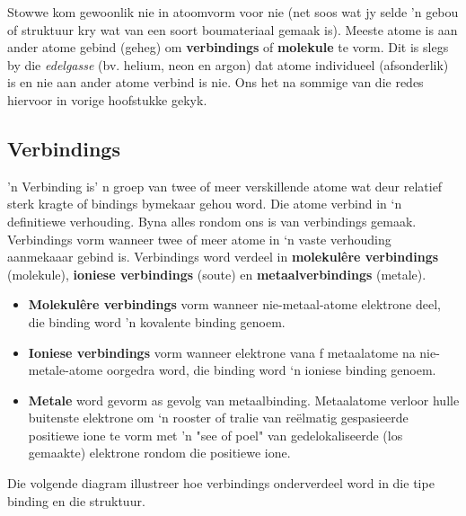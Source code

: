       \label{m38120*id307459}
Stowwe kom gewoonlik nie in atoomvorm voor nie (net soos wat jy selde 'n gebou of struktuur kry wat van een soort boumateriaal gemaak is). Meeste atome is aan ander atome  gebind (geheg) om \textbf{verbindings} of \textbf{molekule} te vorm. Dit is slegs by die \textsl{edelgasse} (bv. helium, neon en argon) dat atome individueel (afsonderlik) is en nie aan ander atome verbind is nie.  Ons het na sommige van die redes hiervoor in vorige hoofstukke gekyk.\par \pagebreak
    \subsection*{Verbindings}
            \nopagebreak

 {'n Verbinding is' n groep van twee of meer verskillende atome wat deur relatief sterk kragte of bindings bymekaar gehou word. Die atome verbind in ‘n definitiewe verhouding.} 
Byna alles rondom ons is van verbindings gemaak. Verbindings vorm wanneer twee of meer atome in ‘n vaste verhouding aanmekaaar gebind is. Verbindings word verdeel in \textbf{molekul\^{e}re verbindings} (molekule), \textbf{ioniese verbindings} (soute) en \textbf{metaalverbindings} (metale).
\begin{itemize}[noitemsep]
 \item \textbf{Molekul\^{e}re verbindings} vorm wanneer nie-metaal-atome elektrone deel, die binding word 'n kovalente binding genoem. 
\item \textbf{Ioniese verbindings} vorm wanneer elektrone vana f metaalatome na nie-metale-atome oorgedra word, die binding word ‘n ioniese binding genoem. 
\item \textbf{Metale} word gevorm as gevolg van metaalbinding. Metaalatome verloor hulle buitenste elektrone om ‘n rooster of tralie van reëlmatig gespasieerde positiewe ione te vorm met 'n "see of poel" van gedelokaliseerde (los gemaakte) elektrone rondom die positiewe ione. 
\end{itemize}
Die volgende diagram illustreer hoe verbindings onderverdeel word in die tipe binding en die struktuur.
